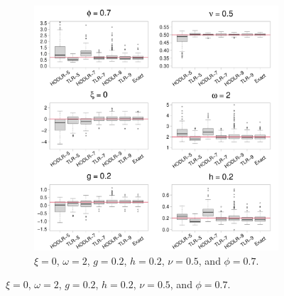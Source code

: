 \documentclass[conference]{IEEEtran}
\begin{document}
\begin{figure}[htp!]
\begin{subfigure}{0.45\textwidth}
  \includegraphics[width=\linewidth]{./figures/boxplot_0.700000_0.200000_0.200000.pdf}
   \caption{  $\xi = 0$, $\omega = 2$, $g = 0.2$, $h = 0.2$, $\nu = 0.5$, and $\phi = 0.7$.}
\end{subfigure}


\end{figure}
\end{document}
